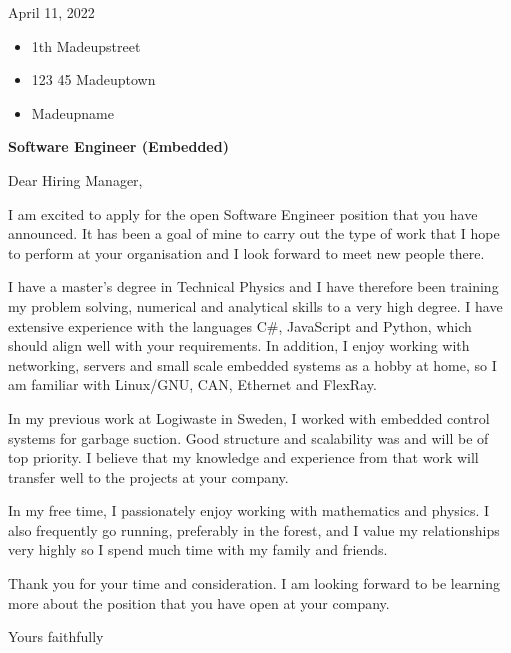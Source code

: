 April 11, 2022

\begin{itemize}
	\item 1th Madeupstreet
	\item 123 45 Madeuptown
	\item Madeupname
\end{itemize}

\bigskip

\textbf{Software Engineer (Embedded)}

Dear Hiring Manager,

I am excited to apply for the open Software Engineer position that you have announced. It has been a goal of mine to carry out the type of work that I hope to perform at your organisation and I look forward to meet new people there. 

I have a master's degree in Technical Physics and I have therefore been training my problem solving, numerical and analytical skills to a very high degree. I have extensive experience with the languages C\#, JavaScript and Python, which should align well with your requirements. In addition, I enjoy working with networking, servers and small scale embedded systems as a hobby at home, so I am familiar with Linux/GNU, CAN, Ethernet and FlexRay.

In my previous work at Logiwaste in Sweden, I worked with embedded control systems for garbage suction. Good structure and scalability was and will be of top priority. I believe that my knowledge and experience from that work will transfer well to the projects at your company.

In my free time, I passionately enjoy working with mathematics and physics. I also frequently go running, preferably in the forest, and I value my relationships very highly so I spend much time with my family and friends.

Thank you for your time and consideration. I am looking forward to be learning more about the position that you have open at your company.

Yours faithfully



































